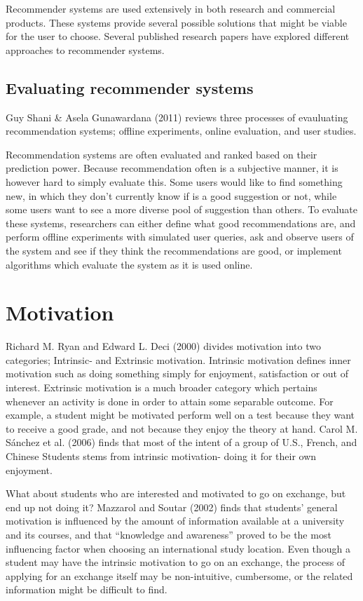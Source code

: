 Recommender systems are used extensively in both research and commercial products. These systems provide several possible solutions that might be viable for the user to choose. Several published research papers have explored different approaches to recommender systems\cite{mulyana2015case}\cite{quijano2011happy}. 

\subsection{Evaluating recommender systems}
Guy Shani \& Asela Gunawardana (2011)\cite{shani2011evaluating} reviews three processes of evauluating recommendation systems; offline experiments, online evaluation, and user studies.

Recommendation systems are often evaluated and ranked based on their prediction power\cite{shani2011evaluating}. Because recommendation often is a subjective manner, it is however hard to simply evaluate this. Some users would like to find something new, in which they don't currently know if is a good suggestion or not, while some users want to see a more diverse pool of suggestion than others\cite{shani2011evaluating}. To evaluate these systems, researchers can either define what good recommendations are, and perform offline experiments with simulated user queries, ask and observe users of the system and see if they think the recommendations are good, or implement algorithms which evaluate the system as it is used online.

\section{Motivation}
Richard M. Ryan and Edward L. Deci (2000)\cite{ryan2000intrinsic} divides motivation into two categories; Intrinsic- and Extrinsic motivation. Intrinsic motivation defines inner motivation such as doing something simply for enjoyment, satisfaction or out of interest. Extrinsic motivation is a much broader category which pertains whenever an activity is done in order to attain some separable outcome\cite{ryan2000intrinsic}. For example, a student might be motivated perform well on a test because they want to receive a good grade, and not because they enjoy the theory at hand. Carol M. Sánchez et al. (2006)\cite{sanchez2006motivations} finds that most of the intent of a group of U.S., French, and Chinese Students stems from intrinsic motivation- doing it for their own enjoyment. 

What about students who are interested and motivated to go on exchange, but end up not doing it? Mazzarol and Soutar (2002)\cite{mazzarol2002push} finds that students' general motivation is influenced by the amount of information available at a university and its courses, and that \enquote{knowledge and awareness} proved to be the most influencing factor when choosing an international study location. Even though a student may have the intrinsic motivation to go on an exchange, the process of applying for an exchange itself may be non-intuitive, cumbersome, or the related information might be difficult to find. 



\cleardoublepage
